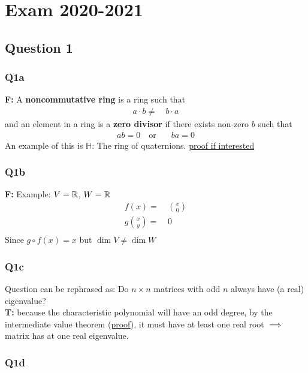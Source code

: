 \section{Exam 2020-2021}

\subsection{Question 1}
\subsubsection{Q1a}
\textbf{F:} A \textbf{noncommutative ring} is a ring such that 
\begin{align*}
	a\cdot b \neq&\ b\cdot a 
\end{align*}
and an element in a ring is a \textbf{zero divisor} if there exists non-zero $b$ such that 
\begin{align*}
	ab=0 \quad \text{or}&\quad ba=0
\end{align*}
An example of this is $\mathbb{H}$: The ring of quaternions. \href{https://mathsci2.appstate.edu/~sjg/class/3110/mathfestalg2000/quaternions.html#:~:text=abelian\%20under\%20multiplication.-,Quaternions\%20are\%20Not\%20an\%20Integral,but\%20have\%20no\%20zero\%2Ddivisors.}{proof if interested}
\subsubsection{Q1b}
\textbf{F:} Example: $V=\mathbb{R}$, $W=\mathbb{R}$
\begin{align*}
f(x)=&\ \binom{x}{0}	\\
g\binom{x}{y}=&\ 0	\\
\end{align*}
Since $g\circ f(x)=x$ but $\dim{V}\neq\dim{W}$


\subsubsection{Q1c}
Question can be rephrased as: Do $n\times n$ matrices with odd $n$ always have (a real) eigenvalue?\\
\noindent\textbf{T:} because the characteristic polynomial will have an odd degree, by the intermediate value theorem (\href{https://math.stackexchange.com/questions/689575/proof-that-every-polynomial-of-odd-degree-has-one-real-root}{proof}), it must have at least one real root $\implies$ matrix has at one real eigenvalue.
\subsubsection{Q1d}

